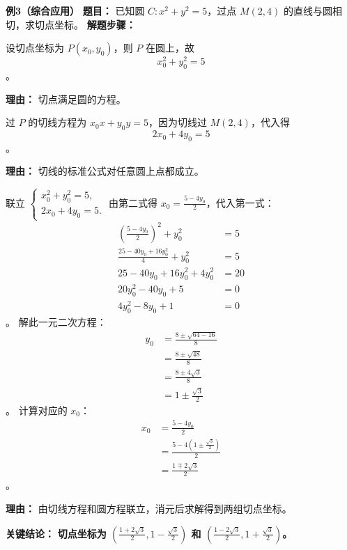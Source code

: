 \begin{examplebox}
	\medskip
	\textbf{\textcolor{CExample}{例3（综合应用）}}
	\textbf{\textcolor{CExample}{题目：}}
	已知圆 $C: x^2+y^2=5$，过点 $M(2,4)$ 的直线与圆相切，求切点坐标。
	\textbf{\textcolor{CExample}{解题步骤：}}
	\begin{description}[style=nextline, leftmargin=2.8em, labelsep=0.5em, itemsep=0.45em]
		\item[\textbf{第一步（设切点）：}]
			设切点坐标为 $P(x_0,y_0)$，则 $P$ 在圆上，故
			\[
				x_0^2 + y_0^2 = 5
			\]
			。
			\par\textbf{理由：} 切点满足圆的方程。
		\item[\textbf{第二步（写切线并代点）：}]
			过 $P$ 的切线方程为 $x_0 x + y_0 y = 5$，因为切线过 $M(2,4)$，代入得
			\[
				2x_0 + 4y_0 = 5
			\]
			。
			\par\textbf{理由：} 切线的标准公式对任意圆上点都成立。
		\item[\textbf{第三步（解方程组）：}]
			联立 $
			\begin{cases}
				x_0^2+y_0^2=5,\\ 2x_0+4y_0=5.
		\end{cases}
			$ 由第二式得 $x_0=\frac{5-4y_0}{2}$，代入第一式：
			\[
				\begin{aligned}
					\left(\frac{5-4y_0}{2}\right)^2 + y_0^2 &= 5 \\ \frac{25-40y_0+16y_0^2}{4} + y_0^2 &= 5 \\ 25-40y_0+16y_0^2+4y_0^2 &= 20 \\ 20y_0^2-40y_0+5 &= 0 \\ 4y_0^2-8y_0+1 &= 0
			\end{aligned}
			\]
			。 解此一元二次方程：
			\[
				\begin{aligned}
					y_0 &= \frac{8\pm\sqrt{64-16}}{8} \\ &= \frac{8\pm\sqrt{48}}{8} \\ &= \frac{8\pm4\sqrt{3}}{8} \\ &= 1\pm\frac{\sqrt{3}}{2}
			\end{aligned}
			\]
			。 计算对应的 $x_0$：
			\[
				\begin{aligned}
					x_0 &= \frac{5-4y_0}{2} \\ &= \frac{5-4\left(1\pm\frac{\sqrt{3}}{2}\right)}{2} \\ &= \frac{1\mp 2\sqrt{3}}{2}
			\end{aligned}
			\]
			。
			\par\textbf{理由：} 由切线方程和圆方程联立，消元后求解得到两组切点坐标。
	\end{description}
	\textbf{\textcolor{CExample}{关键结论：}}
	\textbf{切点坐标为 $(\frac{1+2\sqrt{3}}{2}, 1-\frac{\sqrt{3}}{2})$ 和 $(\frac{1-2\sqrt{3}}{2}, 1+\frac{\sqrt{3}}{2})$。}
\end{examplebox}
